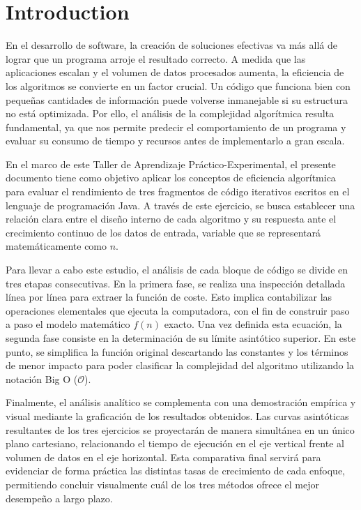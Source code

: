 \documentclass[pdflatex,sn-mathphys-num]{sn-jnl}%
\theoremstyle{thmstyleone}%
\theoremstyle{thmstyletwo}%
\theoremstyle{thmstylethree}%
\begin{document}
\section{Introduction}\label{sec1}
En el desarrollo de software, la creación de soluciones efectivas va más allá de lograr que un programa arroje el resultado correcto. A medida que las aplicaciones escalan y el volumen de datos procesados aumenta, la eficiencia de los algoritmos se convierte en un factor crucial. Un código que funciona bien con pequeñas cantidades de información puede volverse inmanejable si su estructura no está optimizada. Por ello, el análisis de la complejidad algorítmica resulta fundamental, ya que nos permite predecir el comportamiento de un programa y evaluar su consumo de tiempo y recursos antes de implementarlo a gran escala.

En el marco de este Taller de Aprendizaje Práctico-Experimental, el presente documento tiene como objetivo aplicar los conceptos de eficiencia algorítmica para evaluar el rendimiento de tres fragmentos de código iterativos escritos en el lenguaje de programación Java. A través de este ejercicio, se busca establecer una relación clara entre el diseño interno de cada algoritmo y su respuesta ante el crecimiento continuo de los datos de entrada, variable que se representará matemáticamente como $n$.

Para llevar a cabo este estudio, el análisis de cada bloque de código se divide en tres etapas consecutivas. En la primera fase, se realiza una inspección detallada línea por línea para extraer la función de coste. Esto implica contabilizar las operaciones elementales que ejecuta la computadora, con el fin de construir paso a paso el modelo matemático $f(n)$ exacto. Una vez definida esta ecuación, la segunda fase consiste en la determinación de su límite asintótico superior. En este punto, se simplifica la función original descartando las constantes y los términos de menor impacto para poder clasificar la complejidad del algoritmo utilizando la notación Big O ($\mathcal{O}$).

Finalmente, el análisis analítico se complementa con una demostración empírica y visual mediante la graficación de los resultados obtenidos. Las curvas asintóticas resultantes de los tres ejercicios se proyectarán de manera simultánea en un único plano cartesiano, relacionando el tiempo de ejecución en el eje vertical frente al volumen de datos en el eje horizontal. Esta comparativa final servirá para evidenciar de forma práctica las distintas tasas de crecimiento de cada enfoque, permitiendo concluir visualmente cuál de los tres métodos ofrece el mejor desempeño a largo plazo.
\end{document}

